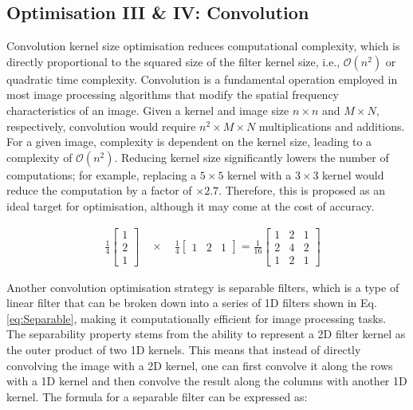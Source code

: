 \subsection{Optimisation III \& IV: Convolution}
Convolution kernel size optimisation reduces computational complexity, which is directly proportional to the squared size of the filter kernel size, i.e., \(\mathcal{O}(n^2)\) or quadratic time complexity. Convolution is a fundamental operation employed in most image processing algorithms that modify the spatial frequency characteristics of an image. Given a kernel and image size \(n \times n\) and \(M \times N\), respectively, convolution would require \(n^2\times M \times N \) multiplications and additions. For a given image, complexity is dependent on the kernel size, leading to a complexity of \(\mathcal{O}(n^2)\). Reducing kernel size significantly lowers the number of computations; for example, replacing a \(5 \times 5\) kernel with a \(3\times3\) kernel would reduce the computation by a factor of \(\times2.7\). Therefore, this is proposed as an ideal target for optimisation, although it may come at the cost of accuracy.



\begin{equation}\label{eq:Separable}
\begin{aligned}
 \quad
 \frac{1}{4} 
\begin{bmatrix}
1 \\ 2 \\ 1
\end{bmatrix}
\quad
\times 
 \quad
 \frac{1}{4} 
\begin{bmatrix}
1 & 2 & 1
\end{bmatrix}
=
\frac{1}{16} 
\begin{bmatrix}
1 & 2 & 1 \\
2 & 4 & 2 \\
1 & 2 & 1
\end{bmatrix}
\end{aligned}
\end{equation}

Another convolution optimisation strategy is separable filters, which is a type of linear filter that can be broken down into a series of 1D filters shown in Eq.\ref{eq:Separable}, making it computationally efficient for image processing tasks. The separability property stems from the ability to represent a 2D filter kernel as the outer product of two 1D kernels. This means that instead of directly convolving the image with a 2D kernel, one can first convolve it along the rows with a 1D kernel and then convolve the result along the columns with another 1D kernel. The formula for a separable filter can be expressed as:

